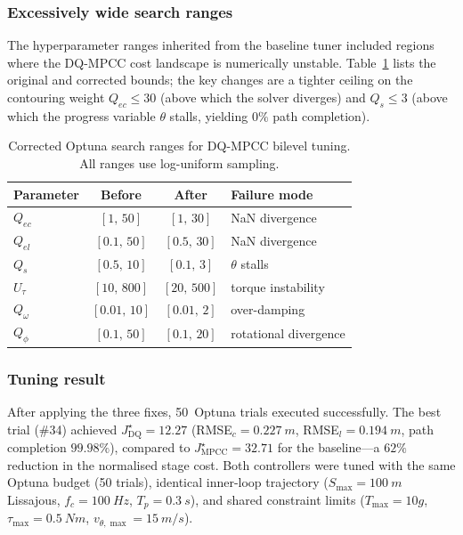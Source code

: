 \subsubsection{Excessively wide search ranges}
\label{sec:bug_ranges}

The hyperparameter ranges inherited from the baseline tuner
included regions where the DQ-MPCC cost landscape is
numerically unstable.
Table~\ref{tab:ranges} lists the original and corrected bounds;
the key changes are a tighter ceiling on the contouring weight
$Q_{ec} \le 30$ (above which the solver diverges) and
$Q_s \le 3$ (above which the progress variable $\theta$
stalls, yielding $0\%$ path completion).

\begin{table}[t]
  \centering
  \caption{Corrected Optuna search ranges for DQ-MPCC bilevel tuning.
           All ranges use log-uniform sampling.}
  \label{tab:ranges}
  \setlength{\tabcolsep}{4pt}
  \begin{tabular}{lccl}
    \toprule
    Parameter & Before & After & Failure mode \\
    \midrule
    $Q_{ec}$    & $[1,\,50]$   & $[1,\,30]$    & NaN divergence \\
    $Q_{el}$    & $[0.1,\,50]$ & $[0.5,\,30]$  & NaN divergence \\
    $Q_s$       & $[0.5,\,10]$ & $[0.1,\,3]$   & $\theta$ stalls \\
    $U_\tau$    & $[10,\,800]$ & $[20,\,500]$   & torque instability \\
    $Q_\omega$  & $[0.01,\,10]$& $[0.01,\,2]$  & over-damping \\
    $Q_\phi$    & $[0.1,\,50]$ & $[0.1,\,20]$  & rotational divergence \\
    \bottomrule
  \end{tabular}
\end{table}

\subsubsection{Tuning result}

After applying the three fixes, 50~Optuna trials executed
successfully.
The best trial (\#34) achieved
$J^{\star}_{\text{DQ}} = 12.27$
(RMSE$_c = \SI{0.227}{m}$,
 RMSE$_l = \SI{0.194}{m}$,
 path completion $99.98\%$),
compared to $J^{\star}_{\text{MPCC}} = 32.71$ for
the baseline—a $62\%$ reduction in the normalised stage cost.
Both controllers were tuned with the same Optuna budget (50 trials),
identical inner-loop trajectory ($S_{\max} = \SI{100}{m}$
Lissajous, $f_c = \SI{100}{Hz}$, $T_p = \SI{0.3}{s}$),
and shared constraint limits
($T_{\max} = 10g$, $\tau_{\max} = \SI{0.5}{Nm}$,
 $v_{\theta,\max} = \SI{15}{m/s}$).


